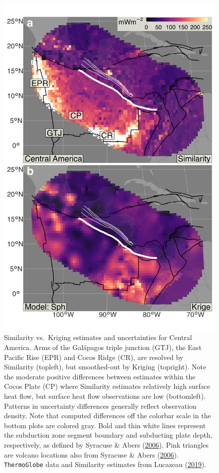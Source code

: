 \begin{figure}[htbp]

{\centering \includegraphics[width=0.74\linewidth,]{assets/figs/chpt3/CentralAmericaDiffComp} 

}

\caption[Similarity vs. Kriging estimates and uncertainties for Central America]{Similarity vs.~Kriging estimates and uncertainties for Central America. Arms of the Galápagos triple junction (GTJ), the East Pacific Rise (EPR) and Cocos Ridge (CR), are resolved by Similarity (topleft), but smoothed-out by Kriging (topright). Note the moderate positive differences between estimates within the Cocos Plate (CP) where Similarity estimates relatively high surface heat flow, but surface heat flow observations are low (bottomleft). Patterns in uncertainty differences generally reflect observation density. Note that computed differences off the colorbar scale in the bottom plots are colored gray. Bold and thin white lines represent the subduction zone segment boundary and subducting plate depth, respectively, as defined by Syracuse \& Abers (\protect\hyperlink{ref-syracuse2006}{2006}). Pink triangles are volcano locations also from Syracuse \& Abers (\protect\hyperlink{ref-syracuse2006}{2006}). \texttt{ThermoGlobe} data and Similarity estimates from Lucazeau (\protect\hyperlink{ref-lucazeau2019}{2019}).}\label{fig:centralAmericaDiff}
\end{figure}



